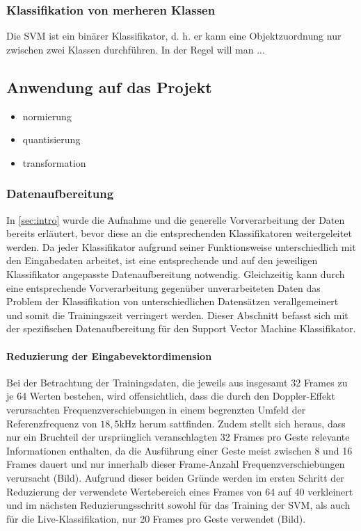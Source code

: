 \newpage

\subsubsection{Klassifikation von merheren Klassen}

Die SVM ist ein binärer Klassifikator, d. h. er kann eine Objektzuordnung nur zwischen zwei Klassen durchführen. 
In der Regel will man ...



\newpage 
\subsection{Anwendung auf das Projekt}
\begin{itemize}
\item{normierung}
\item{quantisierung}
\item{transformation}
\end{itemize}


\subsubsection{Datenaufbereitung}\label{sec:svm_data} 
In \autoref{sec:intro} wurde die Aufnahme und die generelle Vorverarbeitung der Daten bereits erläutert, bevor diese an die entsprechenden Klassifikatoren weitergeleitet werden.
Da jeder Klassifikator aufgrund seiner Funktionsweise unterschiedlich mit den Eingabedaten arbeitet, ist eine entsprechende und auf den jeweiligen Klassifikator angepasste Datenaufbereitung notwendig.
Gleichzeitig kann durch eine entsprechende Vorverarbeitung gegenüber unverarbeiteten Daten das Problem der Klassifikation von unterschiedlichen Datensätzen verallgemeinert und somit die Trainingszeit verringert werden.
Dieser Abschnitt befasst sich mit der spezifischen Datenaufbereitung für den Support Vector Machine Klassifikator.

\paragraph{Reduzierung der Eingabevektordimension}\label{sec:svm_reduce} 
Bei der Betrachtung der Trainingsdaten, die jeweils aus insgesamt 32 Frames zu je 64 Werten bestehen, wird offensichtlich, dass die durch den Doppler-Effekt verursachten Frequenzverschiebungen in einem begrenzten Umfeld der Referenzfrequenz von $18,5\text{kHz}$ herum sattfinden.
Zudem stellt sich heraus, dass nur ein Bruchteil der ursprünglich veranschlagten 32 Frames pro Geste relevante Informationen enthalten, da die Ausführung einer Geste meist zwischen 8 und 16 Frames dauert und nur innerhalb dieser Frame-Anzahl Frequenzverschiebungen verursacht (Bild).
Aufgrund dieser beiden Gründe werden im ersten Schritt der Reduzierung der verwendete Wertebereich eines Frames von 64 auf 40 verkleinert und im nächsten Reduzierungsschritt sowohl für das Training der \ac{SVM}, als auch für die Live-Klassifikation, nur 20 Frames pro Geste verwendet (Bild). 

